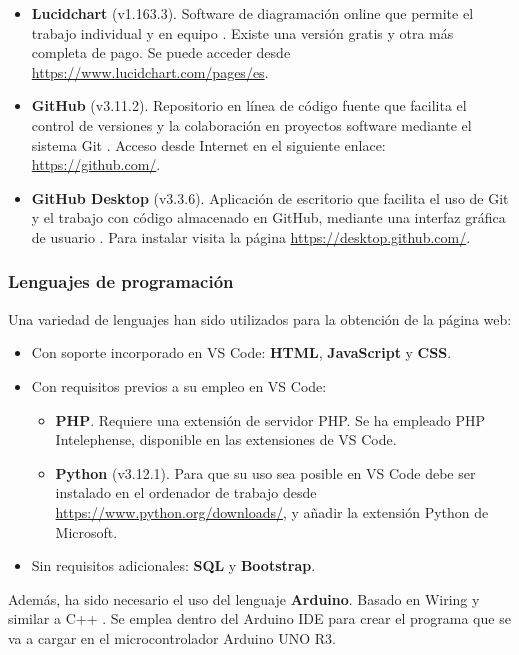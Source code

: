 \begin{itemize}
    \item \textbf{Lucidchart} (v1.163.3). Software de diagramación online que permite el trabajo individual y en equipo \cite{Lucid79:online}. Existe una versión gratis y otra más completa de pago. Se puede acceder desde \url{https://www.lucidchart.com/pages/es}.
    \item \textbf{GitHub} (v3.11.2). Repositorio en línea de código fuente que facilita el control de versiones y la colaboración en proyectos software mediante el sistema Git \cite{Git44:online}. Acceso desde Internet en el siguiente enlace: \url{https://github.com/}.
    \item \textbf{GitHub Desktop} (v3.3.6). Aplicación de escritorio que facilita el uso de Git y el trabajo con código almacenado en GitHub, mediante una interfaz gráfica de usuario \cite{Comenzar98:online}. Para instalar visita la página \url{https://desktop.github.com/}.

\end{itemize}


\subsubsection{Lenguajes de programación}
Una variedad de lenguajes han sido utilizados para la obtención de la página web:
\begin{itemize}
    \item Con soporte incorporado en VS Code: \textbf{HTML}, \textbf{JavaScript} y \textbf{CSS}.
    \item Con requisitos previos a su empleo en VS Code:
    \begin{itemize}
        \item \textbf{PHP}. Requiere una extensión de servidor PHP. Se ha empleado PHP Intelephense, disponible en las extensiones de VS Code.
        \item \textbf{Python} (v3.12.1). Para que su uso sea posible en VS Code debe ser instalado en el ordenador de trabajo desde \url{https://www.python.org/downloads/}, y añadir la extensión Python de Microsoft.
    \end{itemize}
    \item Sin requisitos adicionales: \textbf{SQL} y \textbf{Bootstrap}.
\end{itemize}

Además, ha sido necesario el uso del lenguaje \textbf{Arduino}. Basado en Wiring y similar a C++ \cite{Arduino83:online}. Se emplea dentro del Arduino IDE para crear el programa que se va a cargar en el microcontrolador Arduino UNO R3.


